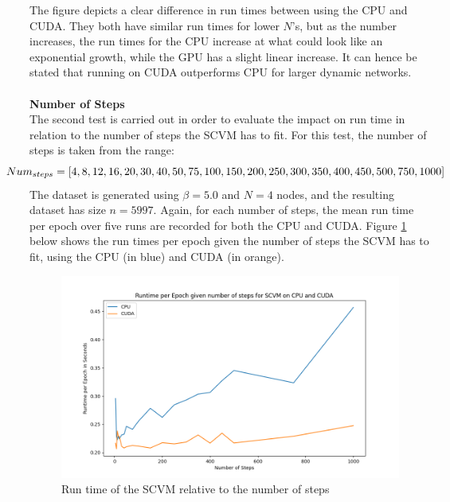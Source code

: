 \vspace*{-1cm}
\noindent
The figure depicts a clear difference in run times between using the CPU and CUDA.
They both have similar run times for lower $N$'s, but as the number increases, the run times for the CPU increase at what could look like an exponential growth, while the GPU has a slight linear increase.
It can hence be stated that running on CUDA outperforms CPU for larger dynamic networks.
\\\\
\textbf{Number of Steps}
\\
The second test is carried out in order to evaluate the impact on run time in relation to the number of steps the SCVM has to fit.
For this test, the number of steps is taken from the range:
\begin{equation*}
    \hspace*{-0.8cm} Num_{steps} = [4,8,12,16,20,30,40,50,75,100,150,200,250,300,350,400,450,500,750,1000]\hspace*{-0.5cm}
\end{equation*}
The dataset is generated using $\beta = 5.0$ and $N = 4$ nodes, and the resulting dataset has size $n = 5997$.
Again, for each number of steps, the mean run time per epoch over five runs are recorded for both the CPU and CUDA.
Figure \ref{fig:NumStepsRuntimes} below shows the run times per epoch given the number of steps the SCVM has to fit, using the CPU (in blue) and CUDA (in orange).
\vspace*{-0.2cm}
\begin{figure}[H]
    \centering
    \includegraphics[width=\textwidth]{0_images/steps_runtime2.png}
    \caption{Run time of the SCVM relative to the number of steps}
    \label{fig:NumStepsRuntimes}
\end{figure}

